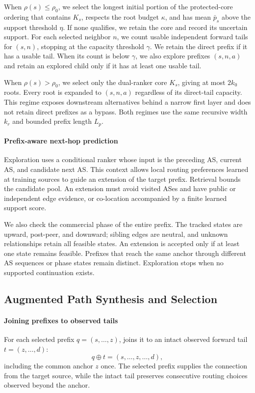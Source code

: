 When $\rho(s)\leq\rho_0$, we select the longest initial portion of the
protected-core ordering that contains $K_s$, respects the root budget
$\kappa$, and has mean $\bar p_s$ above the support threshold $\eta$.
If none qualifies, we retain the core and record its uncertain support.
For each selected neighbor $n$, we count usable independent forward
tails for $(s,n)$, stopping at the capacity threshold $\gamma$. We retain
the direct prefix if it has a usable tail. When its count is below
$\gamma$, we also explore prefixes $(s,n,a)$ and retain an explored
child only if it has at least one usable tail.

When $\rho(s)>\rho_0$, we select only the dual-ranker core $K_s$, giving
at most $2k_0$ roots. Every root is expanded to $(s,n,a)$ regardless of
its direct-tail capacity. This regime exposes downstream alternatives behind
a narrow first layer and does not retain direct prefixes as a bypass.
Both regimes use the same recursive width $k_r$ and bounded prefix
length $L_p$.

\paragraph{Prefix-aware next-hop prediction}
Exploration uses a conditional ranker whose input is the preceding AS,
current AS, and candidate next AS. This context allows local routing
preferences learned at training sources to guide an extension of the
target prefix. Retrieval bounds the candidate pool. An extension must
avoid visited ASes and have public or independent edge evidence, or
co-location accompanied by a finite learned support score.

We also check the commercial phase of the entire prefix. The tracked
states are upward, post-peer, and downward; sibling edges are neutral,
and unknown relationships retain all feasible states. An extension is
accepted only if at least one state remains feasible. Prefixes that
reach the same anchor through different AS sequences or phase states
remain distinct. Exploration stops when no supported continuation exists.

\subsection{Augmented Path Synthesis and Selection}
\label{sec:construction}

\paragraph{Joining prefixes to observed tails}
For each selected prefix $q=(s,\ldots,z)$, \pats joins it to an intact
observed forward tail $t=(z,\ldots,d)$:
\begin{equation}
q\oplus t=(s,\ldots,z,\ldots,d),
\label{eq:pats_join}
\end{equation}
including the common anchor $z$ once. The selected prefix supplies the
connection from the target source, while the intact tail preserves
consecutive routing choices observed beyond the anchor.

